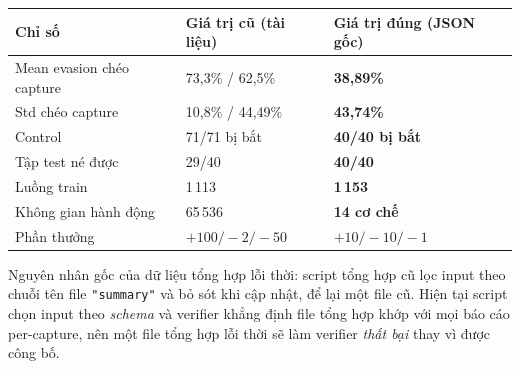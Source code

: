 \documentclass[12pt,a4paper]{report}
\begin{document}
\begin{center}
\begin{tabular}{lll}
\toprule
Chỉ số & Giá trị cũ (tài liệu) & Giá trị đúng (JSON gốc) \\
\midrule
Mean evasion chéo capture & 73{,}3\% / 62{,}5\% & \textbf{38{,}89\%} \\
Std chéo capture          & 10{,}8\% / 44{,}49\% & \textbf{43{,}74\%} \\
Control                   & 71/71 bị bắt & \textbf{40/40 bị bắt} \\
Tập test né được          & 29/40 & \textbf{40/40} \\
Luồng train               & 1\,113 & \textbf{1\,153} \\
Không gian hành động      & 65\,536 & \textbf{14 cơ chế} \\
Phần thưởng               & $+100/-2/-50$ & \textbf{$+10/-10/-1$} \\
\bottomrule
\end{tabular}
\end{center}
Nguyên nhân gốc của dữ liệu tổng hợp lỗi thời: script tổng hợp cũ lọc input theo chuỗi
tên file \texttt{"summary"} và bỏ sót khi cập nhật, để lại một file cũ. Hiện tại script
chọn input theo \emph{schema} và verifier khẳng định file tổng hợp khớp với mọi báo cáo
per-capture, nên một file tổng hợp lỗi thời sẽ làm verifier \emph{thất bại} thay vì
được công bố.



\end{document}

